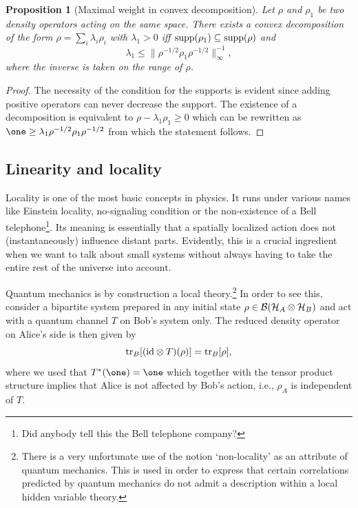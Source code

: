 \documentclass[11pt,a4paper]{article}
\theoremstyle{plain}
\newtheorem{proposition}{Proposition}[section]
\theoremstyle{definition}
\theoremstyle{remark}
\numberwithin{equation}{section}
\begin{document}
\begin{proposition}[Maximal weight in convex decomposition]
    Let $\rho$ and $\rho_1$ be two density operators acting on the same space. There exists a convex decomposition of the form $\rho=\sum_i \lambda_i\rho_i$ with $\lambda_1>0$ iff $\operatorname{supp}(\rho_1)\subseteq \operatorname{supp}(\rho)$ and
    \begin{equation}
        \lambda_1 \le \bigl\|\rho^{-1/2}\rho_1\rho^{-1/2}\bigr\|_\infty^{-1} ,
    \end{equation}
    where the inverse is taken on the range of $\rho$.
\end{proposition}

\begin{proof}
    The necessity of the condition for the supports is evident since adding positive operators can never decrease the support. The existence of a decomposition is equivalent to $\rho-\lambda_1\rho_1\ge 0$ which can be rewritten as $\one \ge \lambda_1 \rho^{-1/2}\rho_1\rho^{-1/2}$ from which the statement follows.
\end{proof}

\subsection{Linearity and locality}

Locality is one of the most basic concepts in physics. It runs under various names like Einstein locality, no-signaling condition or the non-existence of a Bell telephone\footnote{Did anybody tell this the Bell telephone company?}. Its meaning is essentially that a spatially localized action does not (instantaneously) influence distant parts. Evidently, this is a crucial ingredient when we want to talk about small systems without always having to take the entire rest of the universe into account.

Quantum mechanics is by construction a local theory.\footnote{There is a very unfortunate use of the notion `non-locality' as an attribute of quantum mechanics. This is used in order to express that certain correlations predicted by quantum mechanics do not admit a description within a local hidden variable theory.} In order to see this, consider a bipartite system prepared in any initial state $\rho\in \mathcal{B}(\mathcal{H}_A\otimes \mathcal{H}_B)$ and act with a quantum channel $T$ on Bob's system only. The reduced density operator on Alice's side is then given by
\begin{equation}
    \operatorname{tr}_B[(\mathrm{id}\otimes T)(\rho)] = \operatorname{tr}_B[\rho],
\end{equation}
where we used that $T^\ast(\one)=\one$ which together with the tensor product structure implies that Alice is not affected by Bob's action, i.e., $\rho_A$ is independent of $T$.
\end{document}
